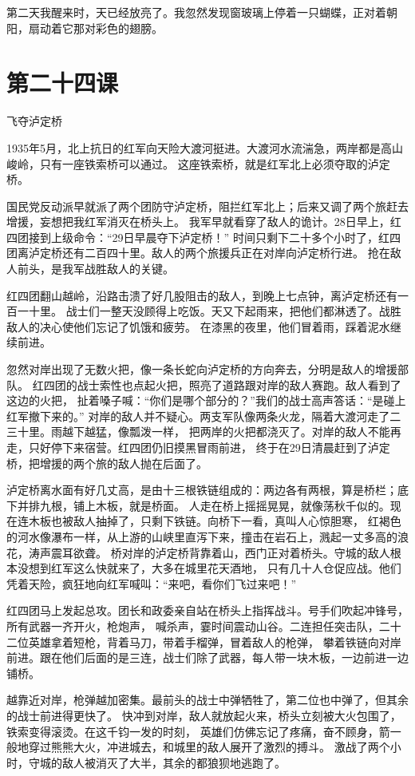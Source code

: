 \documentclass[12pt,UTF8]{ctexbook}
\begin{document}
第二天我醒来时，天已经放亮了。我忽然发现窗玻璃上停着一只蝴蝶，正对着朝阳，扇动着它那对彩色的翅膀。

\section{第二十四课}

飞夺泸定桥

1935年5月，北上抗日的红军向天险大渡河挺进。大渡河水流湍急，两岸都是高山峻岭，只有一座铁索桥可以通过。
这座铁索桥，就是红军北上必须夺取的泸定桥。

国民党反动派早就派了两个团防守泸定桥，阻拦红军北上；后来又调了两个旅赶去增援，妄想把我红军消灭在桥头上。
我军早就看穿了敌人的诡计。28日早上，红四团接到上级命令：“29日早晨夺下泸定桥！”
时间只剩下二十多个小时了，红四团离泸定桥还有二百四十里。敌人的两个旅援兵正在对岸向泸定桥行进。
抢在敌人前头，是我军战胜敌人的关键。

红四团翻山越岭，沿路击溃了好几股阻击的敌人，到晚上七点钟，离泸定桥还有一百一十里。
战士们一整天没顾得上吃饭。天又下起雨来，把他们都淋透了。战胜敌人的决心使他们忘记了饥饿和疲劳。
在漆黑的夜里，他们冒着雨，踩着泥水继续前进。

忽然对岸出现了无数火把，像一条长蛇向泸定桥的方向奔去，分明是敌人的增援部队。
红四团的战士索性也点起火把，照亮了道路跟对岸的敌人赛跑。敌人看到了这边的火把，
扯着嗓子喊：“你们是哪个部分的？”我们的战士高声答话：“是碰上红军撤下来的。”
对岸的敌人并不疑心。两支军队像两条火龙，隔着大渡河走了二三十里。雨越下越猛，像瓢泼一样，
把两岸的火把都浇灭了。对岸的敌人不能再走，只好停下来宿营。红四团仍旧摸黑冒雨前进，
终于在29日清晨赶到了泸定桥，把增援的两个旅的敌人抛在后面了。

泸定桥离水面有好几丈高，是由十三根铁链组成的：两边各有两根，算是桥栏；底下并排九根，铺上木板，就是桥面。
人走在桥上摇摇晃晃，就像荡秋千似的。现在连木板也被敌人抽掉了，只剩下铁链。向桥下一看，真叫人心惊胆寒，
红褐色的河水像瀑布一样，从上游的山峡里直泻下来，撞击在岩石上，溅起一丈多高的浪花，涛声震耳欲聋。
桥对岸的泸定桥背靠着山，西门正对着桥头。守城的敌人根本没想到红军这么快就来了，大多在城里花天酒地，
只有几十人仓促应战。他们凭着天险，疯狂地向红军喊叫：“来吧，看你们飞过来吧！”

红四团马上发起总攻。团长和政委亲自站在桥头上指挥战斗。号手们吹起冲锋号，所有武器一齐开火，枪炮声，
喊杀声，霎时间震动山谷。二连担任突击队，二十二位英雄拿着短枪，背着马刀，带着手榴弹，冒着敌人的枪弹，
攀着铁链向对岸前进。跟在他们后面的是三连，战士们除了武器，每人带一块木板，一边前进一边铺桥。

越靠近对岸，枪弹越加密集。最前头的战士中弹牺牲了，第二位也中弹了，但其余的战士前进得更快了。
快冲到对岸，敌人就放起火来，桥头立刻被大火包围了，铁索变得滚烫。在这千钧一发的时刻，
英雄们仿佛忘记了疼痛，奋不顾身，箭一般地穿过熊熊大火，冲进城去，和城里的敌人展开了激烈的搏斗。
激战了两个小时，守城的敌人被消灭了大半，其余的都狼狈地逃跑了。
\end{document}
